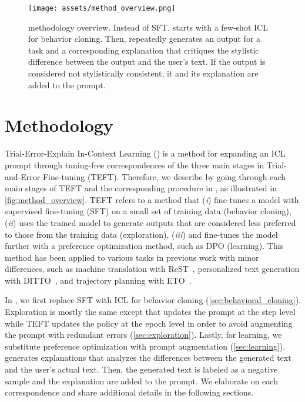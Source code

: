 \begin{figure*}
    \centering
    \texttt{[image: assets/method\_overview.png]}
    \caption{\ours methodology overview. Instead of SFT, \ours starts with a few-shot ICL for behavior cloning. 
    Then, \ours repeatedly generates an output for a task and a corresponding explanation that critiques the stylistic difference between the output and the user's text. If the output is considered not stylistically consistent, it and its explanation are added to the prompt.
    }
    \label{fig:method_overview}
\end{figure*}

\section{Methodology}
\label{sec:methodology}

Trial-Error-Explain In-Context Learning (\ours) is a method for expanding an ICL prompt through tuning-free correspondences of the three main stages in Trial-and-Error Fine-tuning (TEFT). 
Therefore, we describe \ours by going through each main stages of TEFT and the corresponding procedure in \ours, as illustrated in \autoref{fig:method_overview}.
TEFT refers to a method that (\textit{i}) fine-tunes a model with supervised fine-tuning (SFT) on a small set of training data (behavior cloning), (\textit{ii}) uses the trained model to generate outputs that are considered less preferred to those from the training data (exploration), (\textit{iii}) and fine-tunes the model further with a  preference optimization method, such as DPO (learning). 
This method has been applied to various tasks in previous work with minor differences, such as machine translation with ReST~\cite{gulcehre2023reinforced}, personalized text generation with DITTO~\cite{shaikh2024show}, and trajectory planning with ETO~\cite{song-etal-2024-trial}.


In \ours, we first replace SFT with ICL for behavior cloning (\textsection \ref{sec:behavioral_cloning}). 
Exploration is mostly the same except that \ours updates the prompt at the step level while TEFT updates the policy at the epoch level  in order to avoid augmenting the prompt with redundant errors (\textsection \ref{sec:exploration}). 
Lastly, for learning, we substitute preference optimization with prompt augmentation (\textsection \ref{sec:learning}). 
\ours generates explanations that analyzes the differences between the generated text and the user's actual text. Then, the generated text is labeled as a negative sample and the explanation are added to the prompt. 
We elaborate on each correspondence and share additional details in the following sections.



